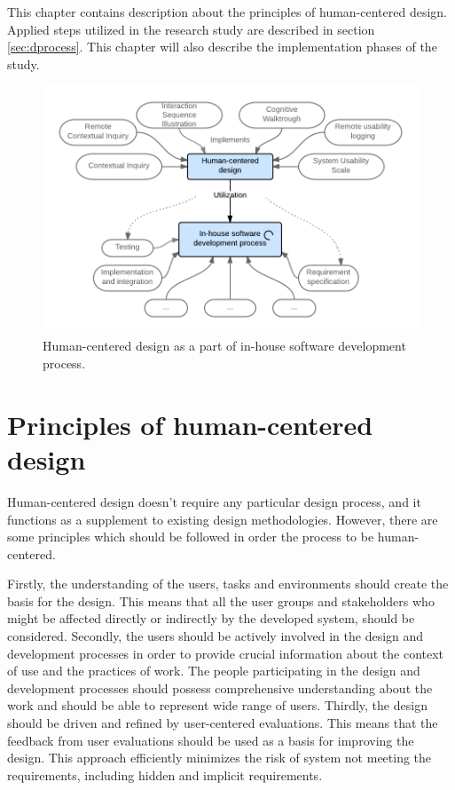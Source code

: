 \documentclass[12pt,a4paper,oneside,pdftex]{report}
\begin{document}
This chapter contains description about the principles of human-centered design. Applied steps utilized in the research study are described in section \ref{sec:dprocess}. This chapter will also describe the implementation phases of the study. 


\begin{figure}[H]
  	\centerline{
    	\includegraphics[width=1.2\textwidth]{./images/lm_process.png}
    	}
  	\caption{Human-centered design as a part of in-house software development process.\cite{RefWorks:16}}
	\label{fig:lm_process}
\end{figure}


\section{Principles of human-centered design}
\label{sec:principles}
Human-centered design doesn't require any particular design process, and it functions as a supplement to existing design methodologies. However, there are some principles which should be followed in order the process to be human-centered. \cite{RefWorks:16}

Firstly, the understanding of the users, tasks and environments should create the basis for the design. This means that all the user groups and stakeholders who might be affected directly or indirectly by the developed system, should be considered.
Secondly, the users should be actively involved in the design and development processes in order to provide crucial information about the context of use and the practices of work. The people participating in the design and development processes should possess comprehensive understanding about the work and should be able to represent wide range of users. Thirdly, the design should be driven and refined by user-centered evaluations. This means that the feedback from user evaluations should be used as a basis for improving the design. This approach efficiently minimizes the risk of system not meeting the requirements, including hidden and implicit requirements. \cite{RefWorks:16}
\end{document}
